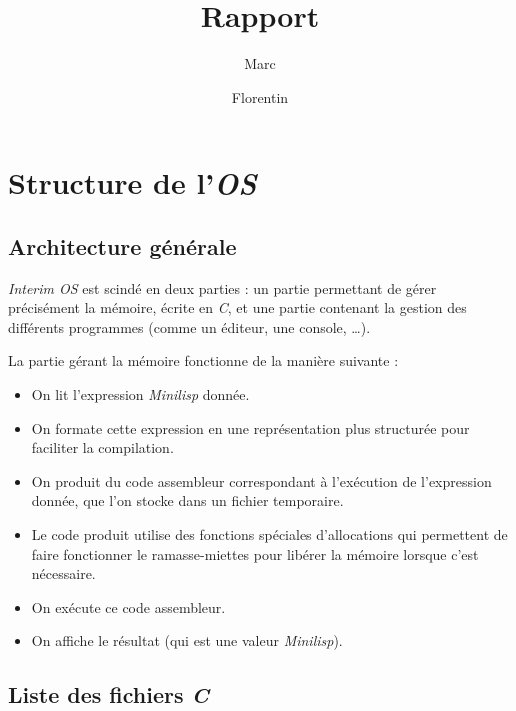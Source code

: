 \documentclass[a4paper, 10pt, french]{article}
\title{Rapport \foreign{Interim OS}}
\author{Marc \bsc{Ducret} \and Florentin \bsc{Guth}}
\newcommand{\foreign}[1]{\emph{#1}}
\begin{document}
\maketitle
\vfill
\tableofcontents
\vfill
\clearpage
\section{Structure de l'\foreign{OS}}

\subsection{Architecture générale}

\foreign{Interim OS} est scindé en deux parties : un partie permettant de gérer précisément la mémoire, écrite en \foreign{C}, et une partie contenant la gestion des différents programmes (comme un éditeur, une console, \ldots).

La partie gérant la mémoire fonctionne de la manière suivante :
\begin{itemize}
  \item On lit l'expression \foreign{Minilisp} donnée.
  \item On formate cette expression en une représentation plus structurée pour faciliter la compilation.
  \item On produit du code assembleur correspondant à l'exécution de l'expression donnée, que l'on stocke dans un fichier temporaire.
  \item Le code produit utilise des fonctions spéciales d'allocations qui permettent de faire fonctionner le ramasse-miettes pour libérer la mémoire lorsque c'est nécessaire.
  \item On exécute ce code assembleur.
  \item On affiche le résultat (qui est une valeur \foreign{Minilisp}).
\end{itemize}

\subsection{Liste des fichiers \foreign{C}}
\end{document}
